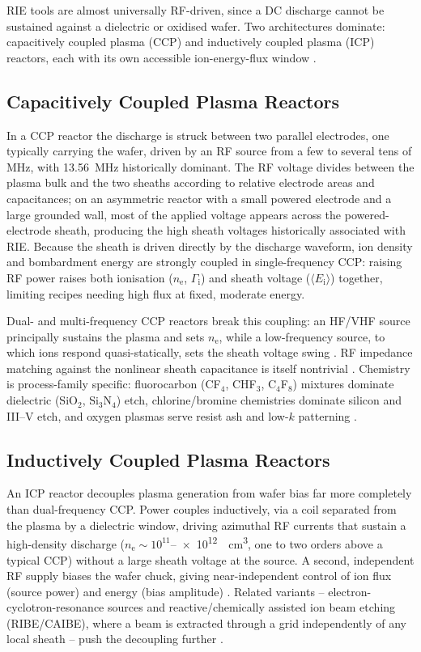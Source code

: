 RIE tools are almost universally RF-driven, since a DC discharge cannot be sustained against a dielectric or oxidised wafer. Two architectures dominate: capacitively coupled plasma (CCP) and inductively coupled plasma (ICP) reactors, each with its own accessible ion-energy-flux window \cite{ref0531}.

\subsection{Capacitively Coupled Plasma Reactors}

In a CCP reactor the discharge is struck between two parallel electrodes, one typically carrying the wafer, driven by an RF source from a few to several tens of \si{\mega\hertz}, with \SI{13.56}{\mega\hertz} historically dominant. The RF voltage divides between the plasma bulk and the two sheaths according to relative electrode areas and capacitances; on an asymmetric reactor with a small powered electrode and a large grounded wall, most of the applied voltage appears across the powered-electrode sheath, producing the high sheath voltages historically associated with RIE. Because the sheath is driven directly by the discharge waveform, ion density and bombardment energy are strongly coupled in single-frequency CCP: raising RF power raises both ionisation ($n_{\mathrm{e}}$, $\Gamma_{\mathrm{i}}$) and sheath voltage ($\langle E_{\mathrm{i}}\rangle$) together, limiting recipes needing high flux at fixed, moderate energy.

Dual- and multi-frequency CCP reactors break this coupling: an HF/VHF source principally sustains the plasma and sets $n_{\mathrm{e}}$, while a low-frequency source, to which ions respond quasi-statically, sets the sheath voltage swing \cite{ref0530}. RF impedance matching against the nonlinear sheath capacitance is itself nontrivial \cite{ref0531}. Chemistry is process-family specific: fluorocarbon (CF$_4$, CHF$_3$, C$_4$F$_8$) mixtures dominate dielectric (SiO$_2$, Si$_3$N$_4$) etch, chlorine/bromine chemistries dominate silicon and III--V etch, and oxygen plasmas serve resist ash and low-$k$ patterning \cite{ref0532}.

\subsection{Inductively Coupled Plasma Reactors}

An ICP reactor decouples plasma generation from wafer bias far more completely than dual-frequency CCP. Power couples inductively, via a coil separated from the plasma by a dielectric window, driving azimuthal RF currents that sustain a high-density discharge ($n_{\mathrm{e}} \sim 10^{11}$--\SI{e12}{\per\cubic\centi\meter}, one to two orders above a typical CCP) without a large sheath voltage at the source. A second, independent RF supply biases the wafer chuck, giving near-independent control of ion flux (source power) and energy (bias amplitude) \cite{ref0530}. Related variants -- electron-cyclotron-resonance sources and reactive/chemically assisted ion beam etching (RIBE/CAIBE), where a beam is extracted through a grid independently of any local sheath -- push the decoupling further \cite{ref0530}.

